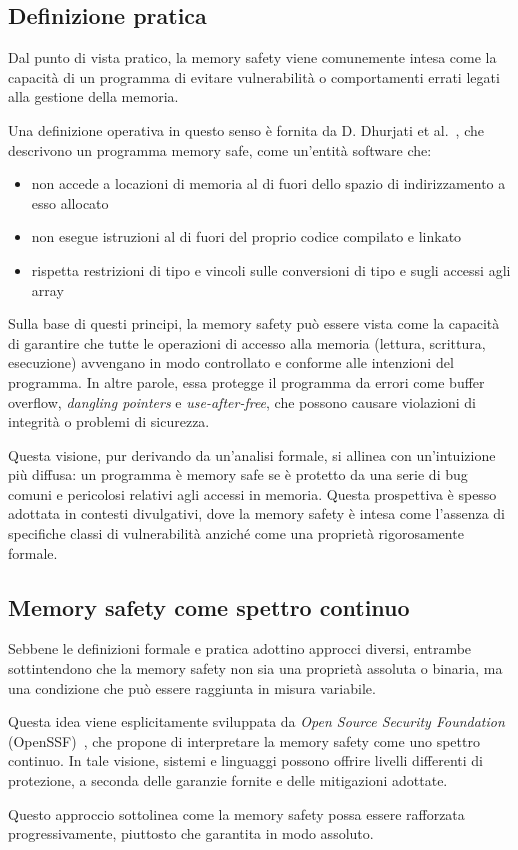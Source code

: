 \subsection{Definizione pratica}
\label{sec:practical_definition}

Dal punto di vista pratico, la memory safety viene comunemente intesa come la capacità
di un programma di evitare vulnerabilità o comportamenti errati legati alla gestione
della memoria.

Una definizione operativa in questo senso è fornita da D. Dhurjati et al.~\cite{memory_safety_without_runtime_checks},
che descrivono un programma memory safe, come un'entità software che:
\begin{itemize}
  \item non accede a locazioni di memoria al di fuori dello spazio di indirizzamento
    a esso allocato

  \item non esegue istruzioni al di fuori del proprio codice compilato e linkato

  \item rispetta restrizioni di tipo e vincoli sulle conversioni di tipo e sugli
    accessi agli array
\end{itemize}

Sulla base di questi principi, la memory safety può essere vista come la
capacità di garantire che tutte le operazioni di accesso alla memoria (lettura,
scrittura, esecuzione) avvengano in modo controllato e conforme alle intenzioni
del programma. In altre parole, essa protegge il programma da errori come buffer
overflow, \textit{dangling pointers} e \textit{use-after-free}, che possono
causare violazioni di integrità o problemi di sicurezza.

Questa visione, pur derivando da un'analisi formale, si allinea con un'intuizione
più diffusa: un programma è memory safe se è protetto da una serie di bug comuni
e pericolosi relativi agli accessi in memoria. Questa prospettiva è spesso
adottata in contesti divulgativi, dove la memory safety è intesa come l'assenza di
specifiche classi di vulnerabilità anziché come una proprietà rigorosamente formale.

\subsection{Memory safety come spettro continuo}
\label{sec:continuum_definition}

Sebbene le definizioni formale e pratica adottino approcci diversi, entrambe sottintendono
che la memory safety non sia una proprietà assoluta o binaria, ma una condizione
che può essere raggiunta in misura variabile.

Questa idea viene esplicitamente sviluppata da \textit{Open Source Security
Foundation} (OpenSSF)~\cite{memory_safety_continuum}, che propone di
interpretare la memory safety come uno spettro continuo. In tale visione,
sistemi e linguaggi possono offrire livelli differenti di protezione, a seconda delle
garanzie fornite e delle mitigazioni adottate.

Questo approccio sottolinea come la memory safety possa essere rafforzata progressivamente,
piuttosto che garantita in modo assoluto.